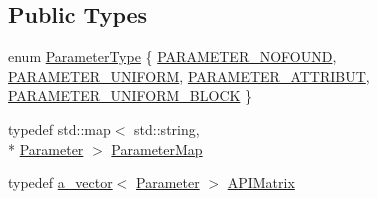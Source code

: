 \subsection*{Public Types}
\begin{DoxyCompactItemize}
\item 
enum \hyperlink{class_agmd_1_1_g_l_shader_program_ad3ee475a349c91e74f4c498c69e9d84a}{Parameter\+Type} \{ \hyperlink{class_agmd_1_1_g_l_shader_program_ad3ee475a349c91e74f4c498c69e9d84aa72897ead0b4b13bd4ea57b1622e67cb9}{P\+A\+R\+A\+M\+E\+T\+E\+R\+\_\+\+N\+O\+F\+O\+U\+N\+D}, 
\hyperlink{class_agmd_1_1_g_l_shader_program_ad3ee475a349c91e74f4c498c69e9d84aad9489828904c9b3ef8564f027024b757}{P\+A\+R\+A\+M\+E\+T\+E\+R\+\_\+\+U\+N\+I\+F\+O\+R\+M}, 
\hyperlink{class_agmd_1_1_g_l_shader_program_ad3ee475a349c91e74f4c498c69e9d84aa6131ee133fa41094a1712c55f91e2ee7}{P\+A\+R\+A\+M\+E\+T\+E\+R\+\_\+\+A\+T\+T\+R\+I\+B\+U\+T}, 
\hyperlink{class_agmd_1_1_g_l_shader_program_ad3ee475a349c91e74f4c498c69e9d84aada604e4700f56288b46b9853c6ddd6b6}{P\+A\+R\+A\+M\+E\+T\+E\+R\+\_\+\+U\+N\+I\+F\+O\+R\+M\+\_\+\+B\+L\+O\+C\+K}
 \}
\item 
typedef std\+::map$<$ std\+::string, \\*
\hyperlink{struct_agmd_1_1_g_l_shader_program_1_1_parameter}{Parameter} $>$ \hyperlink{class_agmd_1_1_g_l_shader_program_a42c0063019239509c29c17ec2f41b42e}{Parameter\+Map}
\item 
typedef \hyperlink{_vector_8h_a3df82cea60ff4ad0acb44e58454406a5}{a\+\_\+vector}$<$ \hyperlink{struct_agmd_1_1_g_l_shader_program_1_1_parameter}{Parameter} $>$ \hyperlink{class_agmd_1_1_g_l_shader_program_a525d0f30ae823bbdb21da274dfe639f5}{A\+P\+I\+Matrix}
\end{DoxyCompactItemize}
